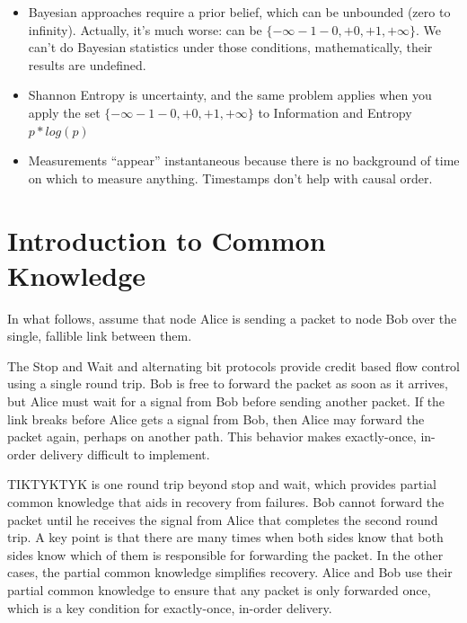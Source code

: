 \documentclass[../HFT-main.tex]{subfiles}
\begin{document}
\begin{description}
\begin{itemize}
	\item  Bayesian approaches require a prior belief, which can be unbounded (zero to infinity). Actually, it’s much worse: can be $\{-\infty-1-0,+0,+1,+\infty\}$. We can’t do Bayesian statistics under those conditions, mathematically, their results are undefined.
	\item Shannon Entropy is uncertainty, and the same problem applies when you apply the set $\{-\infty-1-0,+0,+1,+\infty\}$ to Information and Entropy $p*log(p)$
	\item  Measurements ``appear'' instantaneous because there is no background of time on which to measure anything. Timestamps don’t help with causal order.
	\end{itemize}
\end{description}


\section{Introduction to Common Knowledge}

In what follows, assume that node Alice is sending a packet to node Bob over the single, fallible link between them.

The Stop and Wait and alternating bit protocols provide credit based flow control using a single round trip.  Bob is free to forward the packet as soon as it arrives, but Alice must wait for a signal from Bob before sending another packet.  If the link breaks before Alice gets a signal from Bob, then Alice may forward the packet again, perhaps on another path.  This behavior makes exactly-once, in-order delivery difficult to implement.

TIKTYKTYK is one round trip beyond stop and wait, which provides partial common knowledge that aids in recovery from failures.  Bob cannot forward the packet until he receives the signal from Alice that completes the second round trip.  A key point is that there are many times when both sides know that both sides know which of them is responsible for forwarding the packet.  In the other cases, the partial common knowledge simplifies recovery.  Alice and Bob use their partial common knowledge to ensure that any packet is only forwarded once, which is a key condition for exactly-once, in-order delivery.
\end{document}
